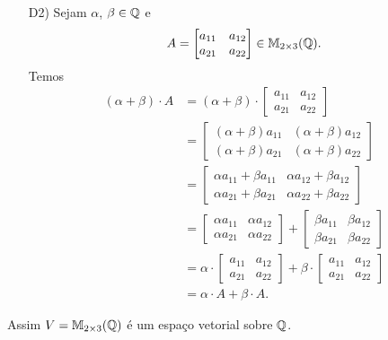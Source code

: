 \documentclass[12pt]{exam}
\begin{document}
\begin{itemize}
        \item[D2)] Sejam $\alpha$, $\beta \in \mathbb{Q}$ e
        \[
        A = \begin{bmatrix} a_{11} & a_{12}\\a_{21} & a_{22}\end{bmatrix} \in \mathbb{M}_{2 \times 3}(\mathbb{Q}).
        \]
        Temos
        \begin{align*}
            (\alpha + \beta)\cdot A & = (\alpha + \beta)\cdot\begin{bmatrix} a_{11} & a_{12}\\a_{21} & a_{22}\end{bmatrix}
            \\ &= \begin{bmatrix} (\alpha + \beta)a_{11} & (\alpha + \beta)a_{12}\\(\alpha + \beta)a_{21} & (\alpha + \beta)a_{22}\end{bmatrix}
            \\ &= \begin{bmatrix} \alpha a_{11} + \beta a_{11} & \alpha a_{12} + \beta a_{12}\\\alpha a_{21} + \beta a_{21} & \alpha a_{22} + \beta a_{22}\end{bmatrix}
            \\ &= \begin{bmatrix} \alpha a_{11} & \alpha a_{12}\\ \alpha a_{21} & \alpha a_{22}\end{bmatrix}
            + \begin{bmatrix} \beta a_{11} & \beta a_{12}\\ \beta a_{21} & \beta a_{22}\end{bmatrix}
            \\ &= \alpha\cdot\begin{bmatrix} a_{11} & a_{12}\\a_{21} & a_{22}\end{bmatrix}  + \beta\cdot\begin{bmatrix} a_{11} & a_{12}\\a_{21} & a_{22}\end{bmatrix}
            \\ &= \alpha\cdot A + \beta\cdot A.
        \end{align*}
    \end{itemize}
    Assim $V = \mathbb{M}_{2 \times 3}(\mathbb{Q})$ é um espaço vetorial sobre $\mathbb{Q}$.
\end{document}
